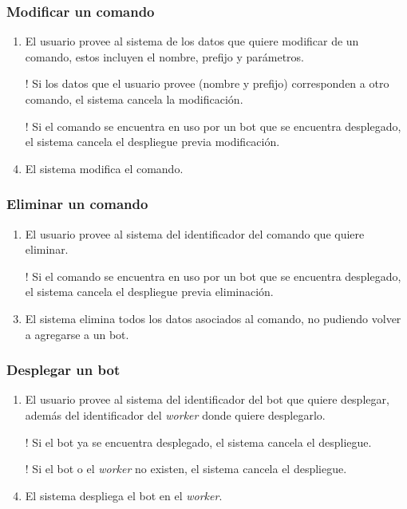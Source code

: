 \subsubsection{Modificar un comando}

\begin{enumerate}
	\item El usuario provee al sistema de los datos que quiere modificar de un comando, estos incluyen el nombre, prefijo y parámetros.
	\item[!] Si los datos que el usuario provee (nombre y prefijo) corresponden a otro comando, el sistema cancela la modificación.
	\item[!] Si el comando se encuentra en uso por un bot que se encuentra desplegado, el sistema cancela el despliegue previa modificación.
	\item El sistema modifica el comando.
\end{enumerate}

\subsubsection{Eliminar un comando}

\begin{enumerate}
	\item El usuario provee al sistema del identificador del comando que quiere eliminar.
	\item[!] Si el comando se encuentra en uso por un bot que se encuentra desplegado, el sistema cancela el despliegue previa eliminación.
	\item El sistema elimina todos los datos asociados al comando, no pudiendo volver a agregarse a un bot.
\end{enumerate}

\subsubsection{Desplegar un bot}

\begin{enumerate}
	\item El usuario provee al sistema del identificador del bot que quiere desplegar, además del identificador del \textit{worker} donde quiere desplegarlo.
	\item[!] Si el bot ya se encuentra desplegado, el sistema cancela el despliegue.
	\item[!] Si el bot o el \textit{worker} no existen, el sistema cancela el despliegue.
	\item El sistema despliega el bot en el \textit{worker}.
\end{enumerate}

